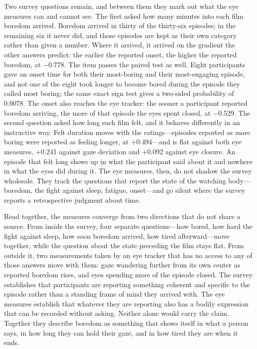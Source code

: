 Two survey questions remain, and between them they mark out what the eye measures can and
cannot see. The first asked how many minutes into each film boredom arrived. Boredom arrived in
thirty of the thirty-six episodes; in the remaining six it never did, and those episodes are
kept as their own category rather than given a number. Where it arrived, it arrived on the
gradient the other answers predict: the earlier the reported onset, the higher the reported
boredom, at $-$0.778. The item passes the paired test as well. Eight participants gave an onset
time for both their most-boring and their most-engaging episode, and not one of the eight took
longer to become bored during the episode they called most boring; the same exact sign test
gives a two-sided probability of 0.0078. The onset also reaches the eye tracker: the sooner a
participant reported boredom arriving, the more of that episode the eyes spent closed, at
$-$0.529. The second question asked how long each film felt, and it behaves differently in an
instructive way. Felt duration moves with the ratings---episodes reported as more boring were
reported as feeling longer, at $+$0.494---and is flat against both eye measures, $+$0.241
against gaze deviation and $+$0.092 against eye closure. An episode that felt long shows up in
what the participant said about it and nowhere in what the eyes did during it. The eye
measures, then, do not shadow the survey wholesale. They track the questions that report the
state of the watching body---boredom, the fight against sleep, fatigue, onset---and go silent
where the survey reports a retrospective judgment about time.

Read together, the measures converge from two directions that do not share a source. From
inside the survey, four separate questions---how bored, how hard the fight against sleep, how
soon boredom arrived, how tired afterward---move together, while the question about the state
preceding the film stays flat. From outside it, two measurements taken by an eye tracker that has no access to any
of those answers move with them: gaze wandering further from its own center as reported boredom
rises, and eyes spending more of the episode closed. The survey establishes that participants
are reporting something coherent and specific to the episode rather than a
standing frame of mind they arrived with. The eye
measures establish that whatever they are reporting also has a bodily expression that can be
recorded without asking. Neither alone would carry the claim. Together they describe boredom as
something that shows itself in what a person says, in how long they can hold their gaze, and in
how tired they are when it ends.


